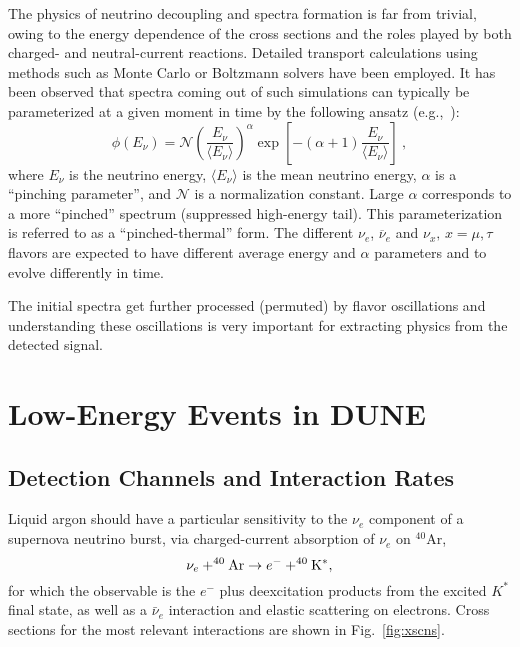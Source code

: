 The physics of neutrino decoupling and spectra formation is far from trivial, owing to the energy dependence of the cross sections and the roles played by both charged- and neutral-current reactions.
Detailed transport calculations using methods such as Monte Carlo or Boltzmann solvers have been employed. It has been observed that spectra coming out of such simulations can typically be parameterized at a given moment in time by the following ansatz (e.g.,~\cite{Minakata:2008nc,Tamborra:2012ac}):
\begin{equation}
        \label{eq:pinched}
        \phi(E_{\nu}) = \mathcal{N} 
        \left(\frac{E_{\nu}}{\langle E_{\nu} \rangle}\right)^{\alpha} \exp\left[-\left(\alpha + 1\right)\frac{E_{\nu}}{\langle E_{\nu} \rangle}\right] \ ,
\end{equation}
where $E_{\nu}$ is the neutrino energy, $\langle E_\nu \rangle$ is the
mean neutrino energy, $\alpha$ is a ``pinching parameter'', and
$\mathcal{N}$ is a normalization constant.
%
Large $\alpha$ corresponds to a more ``pinched'' spectrum (suppressed
high-energy tail). This parameterization is referred to as a
``pinched-thermal'' form. The different $\nu_e$, $\overline{\nu}_e$ and
$\nu_x, \, x = \mu, \tau$ flavors are expected to have different
average energy and $\alpha$ parameters and to evolve differently in
time. 

The initial spectra get further processed (permuted) by flavor oscillations and understanding these oscillations is very important for extracting physics from the detected signal.


\section{Low-Energy Events in DUNE}

\subsection{Detection Channels and Interaction Rates}

Liquid argon should have a particular sensitivity to the $\nu_e$
component of a supernova neutrino burst, via charged-current
absorption of $\nu_e$ on $^{40}$Ar,
\begin{equation}
\nu_e + ^{40}{\rm Ar} \rightarrow e^- + ^{40}{\rm K^*},
\label{eq:nueabs}
\end{equation}
for which the observable is the $e^-$ plus deexcitation products from the excited $K^*$ final state, as well as a $\bar{\nu}_e$ interaction and elastic scattering on electrons.
Cross sections for the most
relevant interactions are shown in Fig.~\ref{fig:xscns}.

